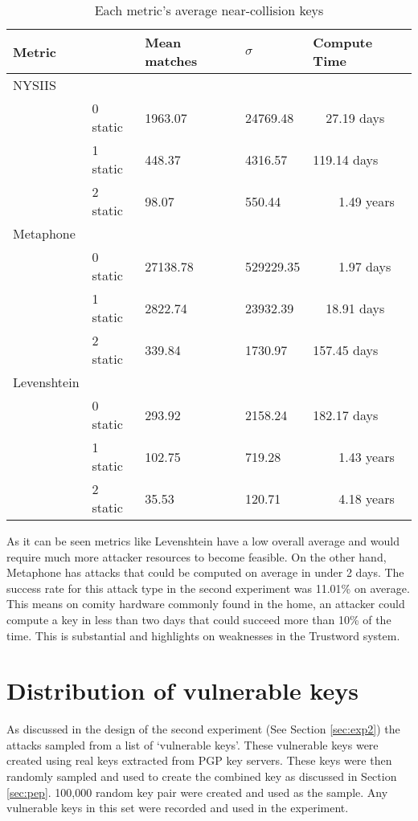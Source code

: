 \begin{table}[!h]
    \centering
    \begin{tabular}{|lllll|}
        \hline
        \textbf{Metric} & & \textbf{Mean matches} & \textbf{$\sigma$} & \textbf{Compute Time} \\
        \hline
        NYSIIS &&&& \\
        \hline
        & 0 static & 1963.07 & 24769.48 & ~~27.19 days \\
        & 1 static & 448.37 & 4316.57 & 119.14 days \\
        & 2 static & 98.07 & 550.44 & ~~~~1.49 years \\
        \hline

        Metaphone &&&& \\
        \hline
        & 0 static & 27138.78 & 529229.35 & ~~~~1.97 days \\
        & 1 static & 2822.74 & 23932.39 & ~~18.91 days \\
        & 2 static & 339.84 & 1730.97 & 157.45 days \\
        \hline

        Levenshtein &&&& \\
        \hline
        & 0 static & 293.92 & 2158.24 & 182.17 days \\
        & 1 static & 102.75 & 719.28 & ~~~~1.43 years \\
        & 2 static & 35.53 & 120.71 & ~~~~4.18 years \\
        \hline

    \end{tabular}
    \caption{Each metric's average near-collision keys}
    \label{tab:average_perm}
\end{table}

As it can be seen metrics like Levenshtein have a low overall average and would require much more attacker resources to become feasible. On the other hand, Metaphone has attacks that could be computed on average in under 2 days. The success rate for this attack type in the second experiment was 11.01\% on average. This means on comity hardware commonly found in the home, an attacker could compute a key in less than two days that could succeed more than 10\% of the time. This is substantial and highlights on weaknesses in the Trustword system.

\section{Distribution of vulnerable keys}
\label{sec:vulnKeys}
As discussed in the design of the second experiment (See Section \ref{sec:exp2}) the attacks sampled from a list of `vulnerable keys'. These vulnerable keys were created using real keys extracted from PGP key servers. These keys were then randomly sampled and used to create the combined key as discussed in Section \ref{sec:pep}. 100,000 random key pair were created and used as the sample. Any vulnerable keys in this set were recorded and used in the experiment.

